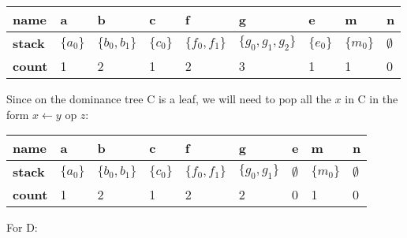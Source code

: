 \begin{center}
\end{center}

\vskip 0.1in

\noindent
\begin{tabularx}{1.0\textwidth}{
    |X|X|X|X|X|X|X|X|X|
}
\hline
\textbf{name} & a & b & c & f & g & e & m & n \\
\hline
\textbf{stack} & $\{a_0\}$ & $\{b_0, b_1\}$ & $\{c_0\}$ & $\{f_0, f_1\}$ & $\{g_0, g_1, g_2\}$ & $\{e_0\}$ & $\{m_0\}$ & $\emptyset$ \\
\hline
\textbf{count} & 1 & 2 & 1 & 2 & 3 & 1 & 1 & 0 \\
\hline
\end{tabularx}

\vskip 0.2in

\noindent Since on the dominance tree C is a leaf, we will need to pop all the $x$ in C in the form $x \leftarrow y \text{ op } z$:

\noindent
\begin{tabularx}{1.0\textwidth}{
    |X|X|X|X|X|X|X|X|X|
}
\hline
\textbf{name} & a & b & c & f & g & e & m & n \\
\hline
\textbf{stack} & $\{a_0\}$ & $\{b_0, b_1\}$ & $\{c_0\}$ & $\{f_0, f_1\}$ & $\{g_0, g_1\}$ & $\emptyset$ & $\{m_0\}$ & $\emptyset$ \\
\hline
\textbf{count} & 1 & 2 & 1 & 2 & 2 & 0 & 1 & 0 \\
\hline
\end{tabularx}


\vskip 0.2in

\noindent For D:

